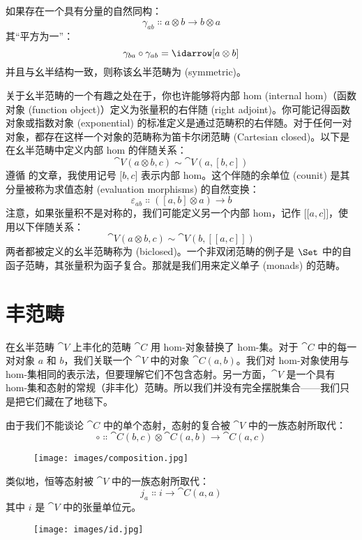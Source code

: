 \noindent
如果存在一个具有分量的自然同构：
\[\gamma_{a b} \Colon a \otimes b \to b \otimes a\]
其“平方为一”：
\[\gamma_{b a} \circ \gamma_{a b} = \idarrow[a \otimes b]\]
并且与幺半结构一致，则称该幺半范畴为  (symmetric)。

关于幺半范畴的一个有趣之处在于，你也许能够将内部 hom (internal hom)（函数对象 (function object)）定义为张量积的右伴随 (right adjoint)。你可能记得函数对象或指数对象 (exponential) 的标准定义是通过范畴积的右伴随。对于任何一对对象，都存在这样一个对象的范畴称为笛卡尔闭范畴 (Cartesian closed)。以下是在幺半范畴中定义内部 hom 的伴随关系：
\[\cat{V}(a \otimes b, c) \sim \cat{V}(a, [b, c])\]
遵循  的文章，我使用记号 ${[}b, c{]}$ 表示内部 hom。这个伴随的余单位 (counit) 是其分量被称为求值态射 (evaluation morphisms) 的自然变换：
\[\varepsilon_{a b} \Colon ([a, b] \otimes a) \to b\]
注意，如果张量积不是对称的，我们可能定义另一个内部 hom，记作 ${[}{[}a, c{]}{]}$，使用以下伴随关系：
\[\cat{V}(a \otimes b, c) \sim \cat{V}(b, [[a, c]])\]
两者都被定义的幺半范畴称为  (biclosed)。一个非双闭范畴的例子是 $\Set$ 中的自函子范畴，其张量积为函子复合。那就是我们用来定义单子 (monads) 的范畴。

\section{丰范畴}

在幺半范畴 $\cat{V}$ 上丰化的范畴 $\cat{C}$ 用 hom-对象替换了 hom-集。对于 $\cat{C}$ 中的每一对对象 $a$ 和 $b$，我们关联一个 $\cat{V}$ 中的对象 $\cat{C}(a, b)$。我们对 hom-对象使用与 hom-集相同的表示法，但要理解它们不包含态射。另一方面，$\cat{V}$ 是一个具有 hom-集和态射的常规（非丰化）范畴。所以我们并没有完全摆脱集合——我们只是把它们藏在了地毯下。

由于我们不能谈论 $\cat{C}$ 中的单个态射，态射的复合被 $\cat{V}$ 中的一族态射所取代：
\[\circ \Colon \cat{C}(b, c) \otimes \cat{C}(a, b) \to \cat{C}(a, c)\]

\begin{figure}[H]
  \centering
  \texttt{[image: images/composition.jpg]}
\end{figure}

\noindent
类似地，恒等态射被 $\cat{V}$ 中的一族态射所取代：
\[j_a \Colon i \to \cat{C}(a, a)\]
其中 $i$ 是 $\cat{V}$ 中的张量单位元。

\begin{figure}[H]
  \centering
  \texttt{[image: images/id.jpg]}
\end{figure}

